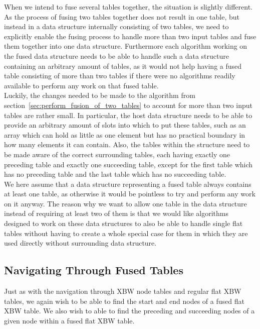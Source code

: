 \documentclass[a4paper,12pt,twoside,BCOR=10mm]{scrbook}
\begin{document}
When we intend to fuse several tables together, the situation is slightly different. 
As the process of fusing two tables together does not result in one table, 
but instead in a data structure internally consisting of two tables, 
we need to explicitly enable the fusing process to handle more than two input tables 
and fuse them together into one data structure. 
Furthermore each algorithm working on the fused data structure needs to be able to 
handle such a data structure containing an arbitrary amount of tables, 
as it would not help having a fused table consisting of more than two tables if there 
were no algorithms readily available to perform any work on that fused table. \\
Luckily, the changes needed to be made to the algorithm from section~\ref{sec:perform_fusion_of_two_tables} to 
account for more than two input tables are rather small. 
In particular, the host data structure needs to be able to provide an arbitrary amount of slots into 
which to put these tables, such as an array which can hold as little as one element but has no practical boundary 
in how many elements it can contain. Also, the tables within the structure need to be made aware of the 
correct surrounding tables, each having exactly one preceding table and exactly one succeeding table, 
except for the first table which has no preceding table and the last table which has no succeeding table. \\
We here assume that a data structure representing a fused table always contains at least 
one table, as otherwise it would be pointless to try and perform any work on it anyway. 
The reason why we want to allow one table in the data structure instead of requiring at least two 
of them is that we would like algorithms designed to work on these data structures to also be 
able to handle single flat tables without having to create a whole special case for them in which 
they are used directly without surrounding data structure.

\subsection{Navigating Through Fused Tables}
\label{sec:fused_table_navigation}

Just as with the navigation through XBW node tables and regular flat XBW tables, 
we again wish to be able to find the start and end nodes of a fused flat XBW table. 
We also wish to able to find the preceding and succeeding nodes of a 
given node within a fused flat XBW table.
\end{document}
